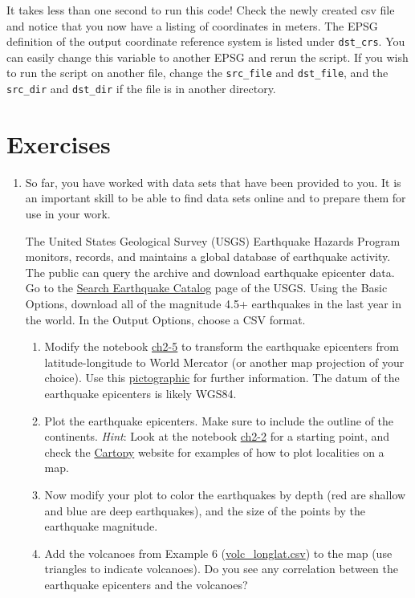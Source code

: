 \documentclass[a4paper , 12pt]{book}
\newcommand{\code}[1]{\colorbox{light-gray}{\texttt{#1}}}
\begin{document}
It takes less than one second to run this code! Check the newly created csv file and notice that you now have a listing of coordinates in meters. The EPSG definition of the output coordinate reference system is listed under \code{dst\_crs}. You can easily change this variable to another EPSG and rerun the script. If you wish to run the script on another file, change the \code{src\_file} and \code{dst\_file}, and the \code{src\_dir} and \code{dst\_dir} if the file is in another directory. 

\section{Exercises}

\begin{enumerate}
    \item So far, you have worked with data sets that have been provided to you. It is an important skill to be able to find data sets online and to prepare them for use in your work. 
    
    The United States Geological Survey (USGS) Earthquake Hazards Program monitors, records, and maintains a global database of earthquake activity. The public can query the archive and download earthquake epicenter data. Go to the \href{https://earthquake.usgs.gov/earthquakes/search/}{Search Earthquake Catalog} page of the USGS. Using the Basic Options, download all of the magnitude 4.5+ earthquakes in the last year in the world. In the Output Options, choose a CSV format.
    
    \begin{enumerate}
        \item Modify the notebook \href{https://github.com/nfcd/compGeo/blob/master/source/notebooks/ch2-5.ipynb}{ch2-5} to transform the earthquake epicenters from latitude-longitude to World Mercator (or another map projection of your choice). Use this \href{https://pubs.usgs.gov/gip/70047422/report.pdf}{pictographic} for further information. The datum of the earthquake epicenters is likely WGS84.
        \item Plot the earthquake epicenters. Make sure to include the outline of the continents. \textit{Hint}: Look at the notebook \href{https://github.com/nfcd/compGeo/blob/master/source/notebooks/ch2-2.ipynb}{ch2-2} for a starting point, and check the \href{https://scitools.org.uk/cartopy/docs/latest/#}{Cartopy} website for examples of how to plot localities on a map.
        \item Now modify your plot to color the earthquakes by depth (red are shallow and blue are deep earthquakes), and the size of the points by the earthquake magnitude. 
        \item Add the volcanoes from Example 6 (\href{https://github.com/nfcd/compGeo/blob/master/source/data/ch2-5/volc_longlat.csv}{volc\_longlat.csv}) to the map (use triangles to indicate volcanoes). Do you see any correlation between the earthquake epicenters and the volcanoes?
        
    \end{enumerate}
\end{enumerate}
\end{document}
